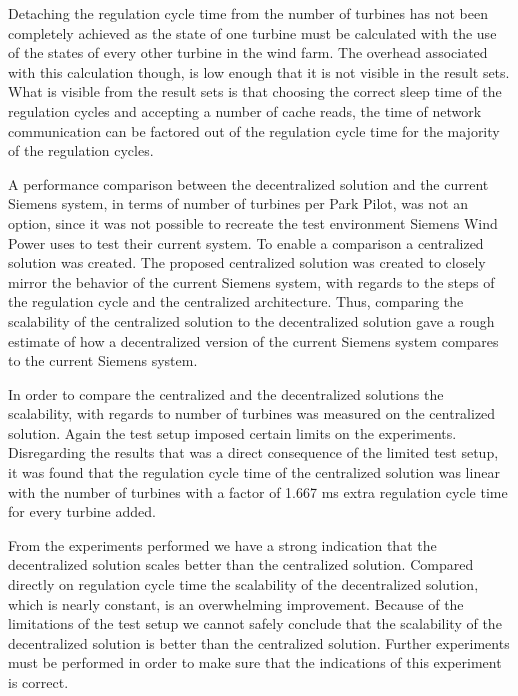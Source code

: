 Detaching the regulation cycle time from the number of turbines has not been completely achieved as the state of one turbine must be calculated with the use of the states of every other turbine in the wind farm. The overhead associated with this calculation though, is low enough that it is not visible in the result sets. What is visible from the result sets is that choosing the correct sleep time of the regulation cycles and accepting a number of cache reads, the time of network communication can be factored out of the regulation cycle time for the majority of the regulation cycles.

A performance comparison between the decentralized solution and the current Siemens system, in terms of number of turbines per Park Pilot, was not an option, since it was not possible to recreate the test environment Siemens Wind Power uses to test their current system. To enable a comparison a centralized solution was created. The proposed centralized solution was created to closely mirror the behavior of the current Siemens system, with regards to the steps of the regulation cycle and the centralized architecture. Thus, comparing the scalability of the centralized solution to the decentralized solution gave a rough estimate of how a decentralized version of the current Siemens system compares to the current Siemens system.

In order to compare the centralized and the decentralized solutions the scalability, with regards to number of turbines was measured on the centralized solution. Again the test setup imposed certain limits on the experiments. Disregarding the results that was a direct consequence of the limited test setup, it was found that the regulation cycle time of the centralized solution was linear with the number of turbines with a factor of 1.667 ms extra regulation cycle time for every turbine added.

From the experiments performed we have a strong indication that the decentralized solution scales better than the centralized solution. Compared directly on regulation cycle time the scalability of the decentralized solution, which is nearly constant, is an overwhelming improvement. Because of the limitations of the test setup we cannot safely conclude that the scalability of the decentralized solution is better than the centralized solution. Further experiments must be performed in order to make sure that the indications of this experiment is correct.

